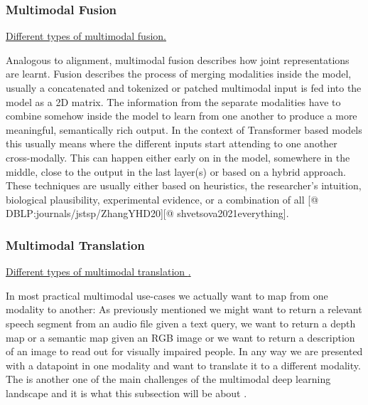 \documentclass[
]{krantz}
\begin{document}
\hypertarget{multimodal-fusion}{%
\subsubsection{Multimodal Fusion}\label{multimodal-fusion}}

\href{figures/03-01/fusion.png}{Different types of multimodal fusion\citep{baltrušaitis2017multimodal}.}

Analogous to alignment, multimodal fusion describes how joint representations are learnt. Fusion describes the process of merging modalities inside the model, usually a concatenated and tokenized or patched multimodal input is fed into the model as a 2D matrix. The information from the separate modalities have to combine somehow inside the model to learn from one another to produce a more meaningful, semantically rich output. In the context of Transformer \citep{DBLP:conf/nips/VaswaniSPUJGKP17} based models this usually means where the different inputs start attending to one another cross-modally. This can happen either early on in the model, somewhere in the middle, close to the output in the last layer(s) or based on a hybrid approach. These techniques are usually either based on heuristics, the researcher's intuition, biological plausibility, experimental evidence, or a combination of all \citep{DBLP:conf/nips/NagraniYAJSS21}{[}@ DBLP:journals/jstsp/ZhangYHD20{]}{[}@ shvetsova2021everything{]}.

\hypertarget{multimodal-translation}{%
\subsubsection{Multimodal Translation}\label{multimodal-translation}}

\href{figures/03-01/translation.png}{Different types of multimodal translation \citep{baltrušaitis2017multimodal}.}

In most practical multimodal use-cases we actually want to map from one modality to another: As previously mentioned we might want to return a relevant speech segment from an audio file given a text query, we want to return a depth map or a semantic map given an RGB image or we want to return a description of an image to read out for visually impaired people\citep{bachmann2022multimae}. In any way we are presented with a datapoint in one modality and want to translate it to a different modality. The is another one of the main challenges of the multimodal deep learning landscape and it is what this subsection will be about \citep{DBLP:journals/mt/SulubacakCGREST20}.
\end{document}
